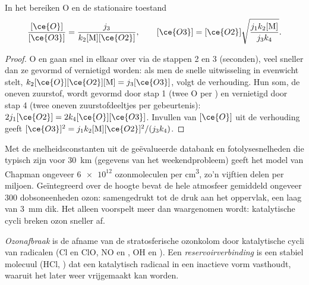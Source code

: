 \begin{theorem}\label{thm:b3:photochemistry:chapman}
In het  bereiken O en  de stationaire toestand
\[
  \frac{[\ce{O}]}{[\ce{O3}]} = \frac{j_3}{k_2[\mathrm M][\ce{O2}]}, \qquad
  [\ce{O3}] = [\ce{O2}]\sqrt{\frac{j_1k_2[\mathrm M]}{j_3k_4}} .
\]
\end{theorem}

\begin{proof}
O en  gaan snel in elkaar over via de stappen 2 en 3 (seconden),
veel sneller dan ze gevormd of vernietigd worden: als men de snelle
uitwisseling in evenwicht stelt,
$k_2[\ce{O}][\ce{O2}][\mathrm M] = j_3[\ce{O3}]$, volgt de verhouding. Hun
som, de oneven zuurstof, wordt gevormd door stap 1 (twee O per )
en vernietigd door stap 4 (twee oneven zuurstofdeeltjes per gebeurtenis):
$2j_1[\ce{O2}] = 2k_4[\ce{O}][\ce{O3}]$. Invullen van $[\ce{O}]$ uit de verhouding geeft $[\ce{O3}]^2 = j_1k_2[\mathrm M][\ce{O2}]^2/(j_3k_4)$.
\end{proof}

Met de snelheidsconstanten uit de geëvalueerde databank en
fotolysesnelheden die typisch zijn voor \qty{30}{km} (gegevens van het
weekendprobleem) geeft het model van Chapman ongeveer
$\num{6e12}$ ozonmoleculen per \unit{cm^3}, zo'n vijftien delen per miljoen.
Geïntegreerd over de hoogte bevat de hele atmosfeer gemiddeld ongeveer 300
dobsoneenheden ozon: samengedrukt tot de druk aan het oppervlak, een laag
van \qty{3}{mm} dik. Het  alleen voorspelt meer dan
waargenomen wordt: katalytische cycli breken ozon sneller af.

\begin{definition}\label{def:b3:photochemistry:ozone-depletion}
\emph{Ozonafbraak} is de afname van de stratosferische
ozonkolom door katalytische cycli van radicalen (Cl en ClO,
NO en , OH en ). Een
\emph{reservoirverbinding}
is een stabiel molecuul (HCl, ) dat een katalytisch radicaal in
een inactieve vorm vasthoudt, waaruit het later weer vrijgemaakt kan
worden.
\end{definition}

